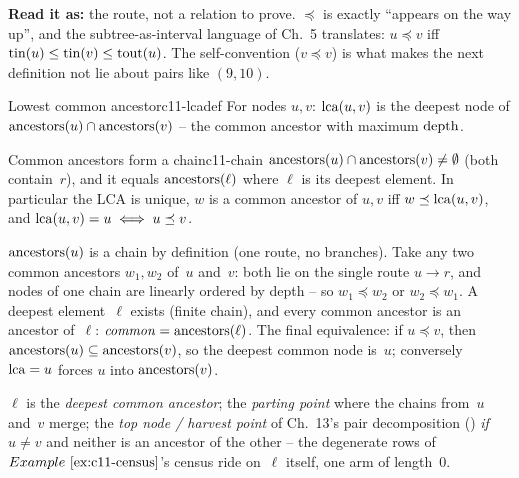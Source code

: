 \noindent\textbf{Read it as:} the route, not a relation to prove.
\(\preceq\) is exactly ``appears on the way up'', and the
subtree-as-interval language of Ch.~5 translates: \(u \preceq v\) iff
\(\operatorname{tin}(u) \le \operatorname{tin}(v) \le \operatorname{tout}(u)\).  The self-convention
(\(v \preceq v\)) is what makes the next definition not lie about pairs
like \((9, 10)\).

\begin{definition}{Lowest common ancestor}{c11-lcadef}
For nodes \(u, v\): \(\operatorname{lca}(u,v)\) is the deepest node of
\(\operatorname{ancestors}(u) \cap \operatorname{ancestors}(v)\) -- the common ancestor with maximum
\(\operatorname{depth}\).
\end{definition}

\begin{proposition}{Common ancestors form a chain}{c11-chain}
\(\operatorname{ancestors}(u) \cap \operatorname{ancestors}(v) \ne \emptyset\) (both contain~\(r\)),
and it equals \(\operatorname{ancestors}(\ell)\) where \(\ell\) is its deepest element.
In particular the LCA is unique, \(w\) is a common ancestor of \(u,v\) iff
\(w \preceq \operatorname{lca}(u,v)\), and \(\operatorname{lca}(u,v) = u \iff u \preceq v\).
\end{proposition}

\begin{proofbox}
\(\operatorname{ancestors}(u)\) is a chain by definition (one route, no branches).  Take
any two common ancestors \(w_1, w_2\) of~\(u\) and~\(v\): both lie on the
single route \(u \to r\), and nodes of one chain are linearly ordered by
depth -- so \(w_1 \preceq w_2\) or \(w_2 \preceq w_1\).  A deepest
element~\(\ell\) exists (finite chain), and every common ancestor is an
ancestor of~\(\ell\): \(\mathit{common} = \operatorname{ancestors}(\ell)\).  The final
equivalence: if \(u \preceq v\), then \(\operatorname{ancestors}(u) \subseteq
\operatorname{ancestors}(v)\), so the deepest common node is~\(u\); conversely
\(\operatorname{lca} = u\) forces \(u\) into \(\operatorname{ancestors}(v)\).
\end{proofbox}

\begin{insightbox}
\(\ell\) is the \emph{deepest common ancestor}; the \emph{parting point}
where the chains from~\(u\) and~\(v\) merge; the \emph{top node / harvest
point} of Ch.~13's pair decomposition () \emph{if}
\(u \ne v\) and neither is an ancestor of the other -- the degenerate rows
of \(\exref{c11-census}\)'s census ride on~\(\ell\) itself, one arm of
length~0.
\end{insightbox}

